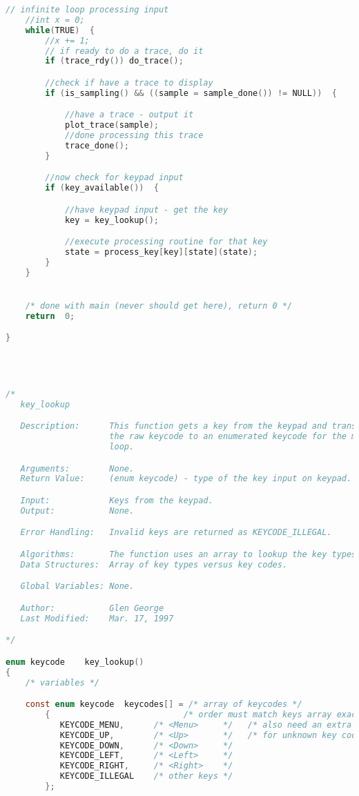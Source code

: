 \begin{lstlisting}[language=C]
    // infinite loop processing input
	//int x = 0;
    while(TRUE)  {
    	//x += 1;
		// if ready to do a trace, do it
		if (trace_rdy()) do_trace();

		//check if have a trace to display
		if (is_sampling() && ((sample = sample_done()) != NULL))  {

			//have a trace - output it
			plot_trace(sample);
			//done processing this trace
			trace_done();
		}

		//now check for keypad input
		if (key_available())  {

			//have keypad input - get the key
			key = key_lookup();

			//execute processing routine for that key
			state = process_key[key][state](state);
		}
    }


    /* done with main (never should get here), return 0 */
    return  0;

}




/*
   key_lookup

   Description:      This function gets a key from the keypad and translates
                     the raw keycode to an enumerated keycode for the main
                     loop.

   Arguments:        None.
   Return Value:     (enum keycode) - type of the key input on keypad.

   Input:            Keys from the keypad.
   Output:           None.

   Error Handling:   Invalid keys are returned as KEYCODE_ILLEGAL.

   Algorithms:       The function uses an array to lookup the key types.
   Data Structures:  Array of key types versus key codes.

   Global Variables: None.

   Author:           Glen George
   Last Modified:    Mar. 17, 1997

*/

enum keycode  	key_lookup()
{
    /* variables */

    const enum keycode  keycodes[] = /* array of keycodes */
        {		                    /* order must match keys array exactly */
           KEYCODE_MENU,      /* <Menu>     */   /* also need an extra element */
           KEYCODE_UP,        /* <Up>       */   /* for unknown key codes */
           KEYCODE_DOWN,      /* <Down>     */
           KEYCODE_LEFT,      /* <Left>     */
           KEYCODE_RIGHT,     /* <Right>    */
           KEYCODE_ILLEGAL    /* other keys */
        }; 


\end{lstlisting}
